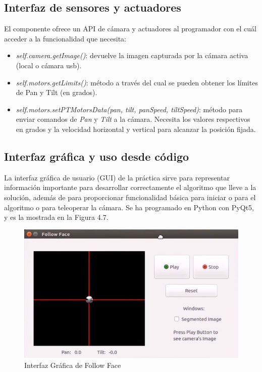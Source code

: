 \subsection{Interfaz de sensores y actuadores}
El componente ofrece un API de cámara y actuadores al programador con el cuál acceder a la funcionalidad que necesita:

\begin{itemize}
	\item \textit{self.camera.getImage()}: devuelve la imagen capturada por la cámara activa (local o cámara usb).
	\item \textit{self.motors.getLimits()}: método a través del cual se pueden obtener los límites de Pan y Tilt (en grados).
	\item \textit{self.motors.setPTMotorsData(pan, tilt, panSpeed, tiltSpeed)}: método para enviar comandos de \textit{Pan} y \textit{Tilt} a la cámara. Necesita los valores respectivos en grados y la velocidad horizontal y vertical para alcanzar la posición fijada.
\end{itemize}

\subsection{Interfaz gráfica y uso desde código}
La interfaz gráfica de usuario (GUI) de la práctica sirve para representar información importante para desarrollar correctamente el algoritmo que lleve a la solución, además de para proporcionar funcionalidad básica para iniciar o para el algoritmo o para teleoperar la cámara. Se ha programado en Python con PyQt5, y es la mostrada en la Figura 4.7.

\begin{figure}[H]
  \begin{center}
    \includegraphics[width=0.99\linewidth]{figures/guifollowface.png}
		\caption{Interfaz Gráfica de Follow Face}
		\label{fig.guifollowface}
		\end{center}
\end{figure}

